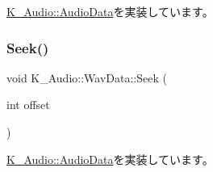\mbox{\hyperlink{class_k___audio_1_1_audio_data_af42b123ad2ce45867401d697fd572392}{K\+\_\+\+Audio\+::\+Audio\+Data}}を実装しています。

\mbox{\label{class_k___audio_1_1_wav_data_a2af2d93fb22fe25a4739c2b40526a7af}} 
\subsubsection{\texorpdfstring{Seek()}{Seek()}}
{\footnotesize\ttfamily void K\+\_\+\+Audio\+::\+Wav\+Data\+::\+Seek (\begin{DoxyParamCaption}\item[{int}]{offset }\end{DoxyParamCaption})\hspace{0.3cm}{\ttfamily [virtual]}}



\mbox{\hyperlink{class_k___audio_1_1_audio_data_a1ba3ab1b4bae0b460d26278cb29ce16e}{K\+\_\+\+Audio\+::\+Audio\+Data}}を実装しています。

